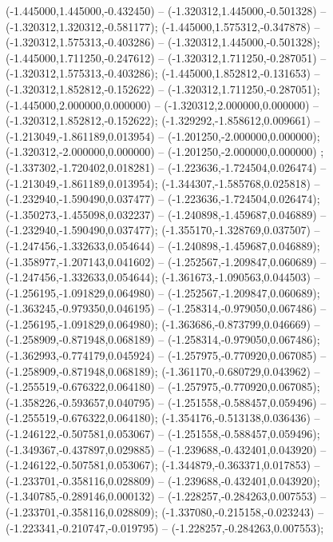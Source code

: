  (-1.445000,1.445000,-0.432450) -- (-1.320312,1.445000,-0.501328) -- (-1.320312,1.320312,-0.581177);
 (-1.445000,1.575312,-0.347878) -- (-1.320312,1.575313,-0.403286) -- (-1.320312,1.445000,-0.501328);
 (-1.445000,1.711250,-0.247612) -- (-1.320312,1.711250,-0.287051) -- (-1.320312,1.575313,-0.403286);
 (-1.445000,1.852812,-0.131653) -- (-1.320312,1.852812,-0.152622) -- (-1.320312,1.711250,-0.287051);
 (-1.445000,2.000000,0.000000) -- (-1.320312,2.000000,0.000000) -- (-1.320312,1.852812,-0.152622);
 (-1.329292,-1.858612,0.009661) -- (-1.213049,-1.861189,0.013954) -- (-1.201250,-2.000000,0.000000);
 (-1.320312,-2.000000,0.000000) -- (-1.201250,-2.000000,0.000000) ;
 (-1.337302,-1.720402,0.018281) -- (-1.223636,-1.724504,0.026474) -- (-1.213049,-1.861189,0.013954);
 (-1.344307,-1.585768,0.025818) -- (-1.232940,-1.590490,0.037477) -- (-1.223636,-1.724504,0.026474);
 (-1.350273,-1.455098,0.032237) -- (-1.240898,-1.459687,0.046889) -- (-1.232940,-1.590490,0.037477);
 (-1.355170,-1.328769,0.037507) -- (-1.247456,-1.332633,0.054644) -- (-1.240898,-1.459687,0.046889);
 (-1.358977,-1.207143,0.041602) -- (-1.252567,-1.209847,0.060689) -- (-1.247456,-1.332633,0.054644);
 (-1.361673,-1.090563,0.044503) -- (-1.256195,-1.091829,0.064980) -- (-1.252567,-1.209847,0.060689);
 (-1.363245,-0.979350,0.046195) -- (-1.258314,-0.979050,0.067486) -- (-1.256195,-1.091829,0.064980);
 (-1.363686,-0.873799,0.046669) -- (-1.258909,-0.871948,0.068189) -- (-1.258314,-0.979050,0.067486);
 (-1.362993,-0.774179,0.045924) -- (-1.257975,-0.770920,0.067085) -- (-1.258909,-0.871948,0.068189);
 (-1.361170,-0.680729,0.043962) -- (-1.255519,-0.676322,0.064180) -- (-1.257975,-0.770920,0.067085);
 (-1.358226,-0.593657,0.040795) -- (-1.251558,-0.588457,0.059496) -- (-1.255519,-0.676322,0.064180);
 (-1.354176,-0.513138,0.036436) -- (-1.246122,-0.507581,0.053067) -- (-1.251558,-0.588457,0.059496);
 (-1.349367,-0.437897,0.029885) -- (-1.239688,-0.432401,0.043920) -- (-1.246122,-0.507581,0.053067);
 (-1.344879,-0.363371,0.017853) -- (-1.233701,-0.358116,0.028809) -- (-1.239688,-0.432401,0.043920);
 (-1.340785,-0.289146,0.000132) -- (-1.228257,-0.284263,0.007553) -- (-1.233701,-0.358116,0.028809);
 (-1.337080,-0.215158,-0.023243) -- (-1.223341,-0.210747,-0.019795) -- (-1.228257,-0.284263,0.007553);
